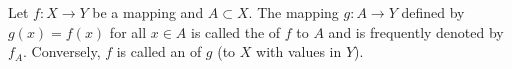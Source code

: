 Let $f: X \rightarrow Y$ be a mapping and $A \subset X$. The mapping $g: A \rightarrow Y$ defined by $g(x) = f(x)$ for all $x \in A$ is called the  of $f$ to $A$ and is frequently denoted by $f_A$. Conversely, $f$ is called an  of $g$ (to $X$ with values in $Y$).

